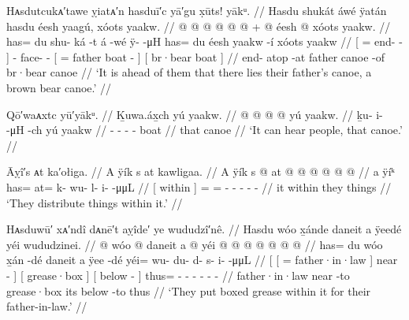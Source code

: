 \ex\label{ex:89-64-canoe-lies-ahead}%
%
\begingl
	\glpreamble	Hᴀsdutcukᴀ′tawe ỵiatᴀ′n hasduī′c yā′gu x̣ūts! yākᵘ. //
	\glpreamble	Hasdu shukát áwé ÿatán hasdu éesh yaagú, xóots yaakw. //
	\gla	{}  @ {}  @ {} @ {} {}  @ {}
		 @ {} @ {} +
		{}  @ {} éesh  @ {} {}
		{} xóots yaakw. {} //
	\glb	{} has= du shu- ká -t {} á -wé
		ÿ-  -μH
		{} has= du éesh yaakw -í {}
		{} xóots yaakw {} //
	\glc	{}[ =  end-  - {}]  -
		face-  -
		{}[ =  father boat - {}]
		{}[ br·bear boat {}] //
	\gld	{}  {} end- atop -at {}  {}
		 {} {}
		{}  {} father canoe -of {}
		{} br·bear canoe {} //
	\glft	‘It is ahead of them that there lies their father’s canoe, a brown bear canoe.’
		//
\endgl
\xe

\ex\label{ex:89-65-canoe-can-hear}%
%
\begingl
	\glpreamble	Qō′waᴀxtc yū′yākᵘ. //
	\glpreamble	Ḵuwa.áx̱ch yú yaakw. //
	\gla	{} @ {} @ {} @ {} @ {} 
		{} yú yaakw. {} //
	\glb	ḵu- i-  -μH -ch
		{} yú yaakw {} //
	\glc	{}- -  - -
		{}  boat {} //
	\gld	{} {} {} {} {}
		{} that canoe {} //
	\glft	‘It can hear people, that canoe.’
		//
\endgl
\xe

\ex\label{ex:89-66-distribute}%
%
\begingl
	\glpreamble	Āỵî′s ᴀt ka′ołiga. //
	\glpreamble	A ÿík s at kawligaa. //
	\gla	{} A ÿík {}
		s @ at @  @ {} @ {} @ {} @ {} @ {} //
	\glb	{} a ÿíᵏ {}
		has= at= k- wu- l- i-  -μμL //
	\glc	{}[  within {}]
		= = - - - -  - //
	\gld	{} it within {} they things\•  {} {} {} {} {} //
	\glft	‘They distribute things within it.’
		//
\endgl
\xe


\ex\label{ex:89-67-grease-for-father}%
%
\begingl
	\glpreamble	Hᴀsduwū′ xᴀ′ndî dᴀnē′t aỵîde′ ye wududzî′nê. //
	\glpreamble	Hasdu wóo x̱ánde daneit a ÿeedé yéi wududzinei. //
	\gla	{} {}  @ {} wóo {}  @ {} {}
		{} daneit {}
		{} a  @ {} {}
		yéi @  @ {} @ {} @ {} @ {} @ {} @ {} //
	\glb	{} {} has= du wóo {} x̱án -dé {}
		{} daneit {} 
		{} a ÿee -dé {}
		yéi= wu- du- d- s- i-  -μμL //
	\glc	{}[ {}[ =  father·in·law {}] near - {}]
		{}[ grease·box {}]
		{}[  below - {}]
		thus= - - - - -  - //
	\gld	{} {}  {} father·in·law {} near -to {}
		{} grease·box {}
		{} its below -to {}
		thus\•  {} {} {} {} {} {} //
	\glft	‘They put boxed grease within it for their father-in-law.’
		//
\endgl
\xe


